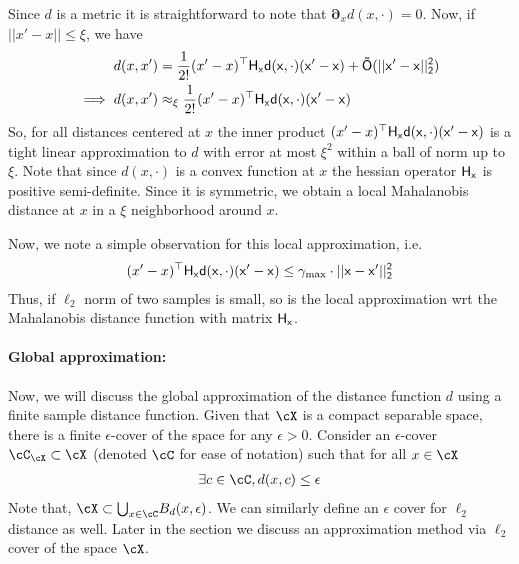 Since $d$ is a metric it is straightforward to note that $\boldsymbol{\partial}_{x} d(x,\cdot) = 0$. Now, if $||x'-x|| \le \xi$, we have
\begin{subequations}\label{eq: 1}
\begin{align}
    d(x,x') &= \frac{1}{2!}(x'-x)^{\top} \sf{H}_x d(x,\cdot) (x'-x) + \Tilde{O}(||x'-x||_2^{2})\\
    \implies d(x,x') &\approx_{\xi} \frac{1}{2!}(x'-x)^{\top} \sf{H}_x d(x,\cdot) (x'-x)
\end{align}
\end{subequations}
So, for all distances centered at $x$ the inner product $(x'-x)^{\top} \sf{H}_x d(x,\cdot) (x'-x)$ is a tight linear approximation to $d$ with error at most $\xi^2$ within a ball of norm up to $\xi$. Note that since $d(x,\cdot)$ is a convex function at $x$ the hessian operator $\sf{H}_x$ is positive semi-definite. Since it is symmetric, we obtain a local Mahalanobis distance at $x$ in a $\xi$ neighborhood around $x$.

Now, we note a simple observation for this local approximation, i.e. 
\begin{align}
    (x'-x)^{\top} \sf{H}_x d(x,\cdot) (x'-x) \le \gamma_{\max}\cdot ||x-x'||_2^2 \label{eq: mahaapp}
\end{align}
Thus, if $\ell_2$ norm of two samples is small, so is the local approximation wrt the Mahalanobis distance function with matrix $\sf{H}_x$.

\paragraph{Global approximation:} Now, we will discuss the global approximation of the distance function $d$ using a finite sample distance function. Given that $\cX$ is a compact separable space, there is a finite $\epsilon$-cover of the space for any $\epsilon > 0$. Consider an $\epsilon$-cover $\cC_{\cX} \subset \cX$ (denoted $\cC$ for ease of notation) such that for all $x \in \cX$
\begin{align*}
    \exists c \in \cC, d(x,c) \le \epsilon %
\end{align*}
Note that, $\cX \subset {\bigcup}_{x \in \cC} B_d(x,\epsilon)$. We can similarly define an $\epsilon$ cover for $\ell_2$ distance as well. Later in the section we discuss an approximation method via $\ell_2$ cover of the space $\cX$.

